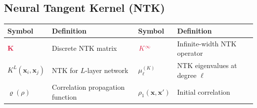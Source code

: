 \documentclass[a4paper]{article}
\theoremstyle{plain}
\theoremstyle{definition}
\theoremstyle{remark}
\begin{document}
\begin{tcolorbox}[colback=blue!5,colframe=blue!50!black,title={\large \textbf{Mathematical Notation Reference}},enhanced,drop shadow]
\subsection*{Neural Tangent Kernel (NTK)}
\begin{longtable}{p{}p{}p{}p{}}
\toprule
\textbf{Symbol} & \textbf{Definition} & \textbf{Symbol} & \textbf{Definition} \\
\midrule
$\textcolor{kernelcolor}{\mathbf{K}}$ & Discrete NTK matrix & $\textcolor{kernelcolor}{K^{\infty}}$ & Infinite-width NTK operator \\
$K^{L}(\mathbf{x}_i, \mathbf{x}_j)$ & NTK for $L$-layer network & $\mu_\ell^{(K)}$ & NTK eigenvalues at degree $\ell$ \\
$\varrho(\rho)$ & Correlation propagation function & $\rho_1(\mathbf{x},\mathbf{x}')$ & Initial correlation \\
\bottomrule
\end{longtable}

\end{tcolorbox}
\end{document}

